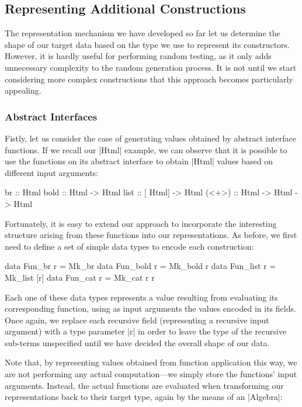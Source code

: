 %
\subsection{Representing Additional Constructions}

The representation mechanism we have developed so far let us determine the shape
of our target data based on the type we use to represent its constructors.
%
However, it is hardly useful for performing random testing, as it only adds
unnecessary complexity to the random generation process.
%
It is not until we start considering more complex constructions that this
approach becomes particularly appealing.

%
%
\subsubsection{Abstract Interfaces}

Fistly, let us consider the case of generating values obtained by abstract
interface functions.
%
If we recall our |Html| example, we can observe that it is possible to use the
functions on its abstract interface to obtain |Html| values based on different
input arguments:

\begin{code}
br     ::                        Html
bold   ::     Html   ->          Html
list   ::  [  Html]  ->          Html
(<+>)  ::     Html   -> Html ->  Html
\end{code}

Fortunately, it is easy to extend our approach to incorporate the interesting
structure arising from these functions into our representations.
%
As before, we first need to define a set of simple data types to encode each
construction:

\begin{code}
data Fun_br     r = Mk_br
data Fun_bold   r = Mk_bold r
data Fun_list   r = Mk_list [r]
data Fun_cat    r = Mk_cat  r r
\end{code}
%
Each one of these data types represents a value resulting from evaluating its
corresponding function, using as input arguments the values encoded in its
fields.
%
Once again, we replace each recursive field (representing a recursive input
argument) with a type parameter |r| in order to leave the type of the recursive
sub-terms unspecified until we have decided the overall shape of our data.


Note that, by representing values obtained from function application this way,
we are not performing any actual computation---we simply store the functions'
input arguments.
%
Instead, the actual functions are evaluated when transforming our
representations back to their target type, again by the means of an |Algebra|:

